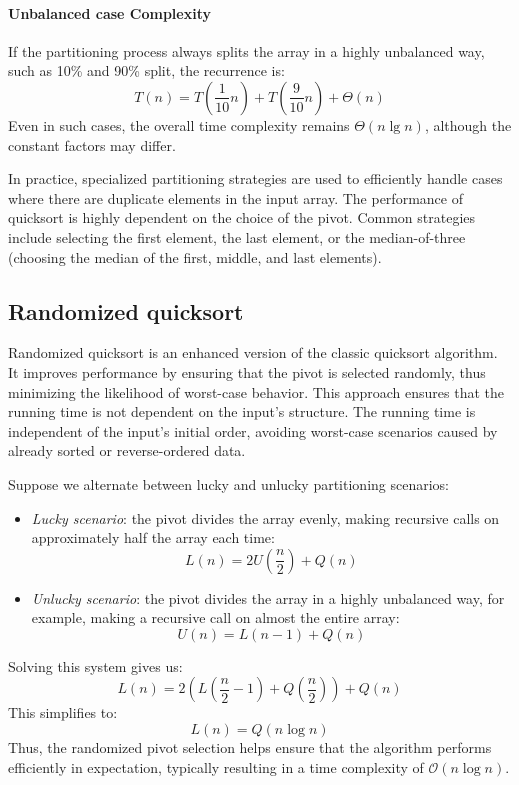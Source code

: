 \paragraph*{Unbalanced case Complexity}
If the partitioning process always splits the array in a highly unbalanced way, such as 10\% and 90\% split, the recurrence is:
\[T(n)=T\left(\dfrac{1}{10}n\right)+T\left(\dfrac{9}{10}n\right)+\Theta(n)\]
Even in such cases, the overall time complexity remains $\Theta(n\lg n)$, although the constant factors may differ. 

In practice, specialized partitioning strategies are used to efficiently handle cases where there are duplicate elements in the input array.
The performance of quicksort is highly dependent on the choice of the pivot. 
Common strategies include selecting the first element, the last element, or the median-of-three (choosing the median of the first, middle, and last elements).

\subsection{Randomized quicksort}
Randomized quicksort is an enhanced version of the classic quicksort algorithm. 
It improves performance by ensuring that the pivot is selected randomly, thus minimizing the likelihood of worst-case behavior. 
This approach ensures that the running time is not dependent on the input's structure.
The running time is independent of the input's initial order, avoiding worst-case scenarios caused by already sorted or reverse-ordered data.

Suppose we alternate between lucky and unlucky partitioning scenarios:
\begin{itemize}
    \item \textit{Lucky scenario}: the pivot divides the array evenly, making recursive calls on approximately half the array each time: 
        \[L(n) = 2U\left(\dfrac{n}{2}\right) + Q(n)\]
    \item \textit{Unlucky scenario}: the pivot divides the array in a highly unbalanced way, for example, making a recursive call on almost the entire array: 
        \[U(n) = L(n - 1) + Q(n)\]
\end{itemize}
Solving this system gives us:
\[L(n) = 2\left(L\left(\dfrac{n}{2}-1\right) + Q\left(\dfrac{n}{2}\right)\right) + Q(n)\]
This simplifies to:
\[L(n)= Q(n \log n)\]
Thus, the randomized pivot selection helps ensure that the algorithm performs efficiently in expectation, typically resulting in a time complexity of $\mathcal{O}(n \log n)$. 

